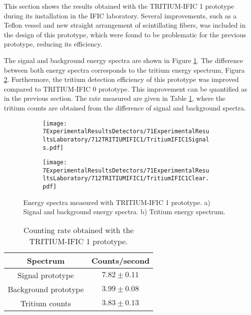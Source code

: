 This section shows the results obtained with the TRITIUM-IFIC 1 prototype  during its installation in the IFIC laboratory. Several improvements, such as a Teflon vessel and new straight arrangement of scintillating fibers, was included in the design of this prototype, which were found to be problematic for the previous prototype, reducing its efficiency.

The signal and background energy spectra are shown in Figure \ref{subfig:SignalBackgroundEnergySpectraTritiumIFIC1}. The difference between both energy spectra corresponds to the tritium energy spectrum, Figura \ref{subfig:TritiumEnergySpectraTritiumIFIC1}. Furthermore, the tritium detection efficiency of this prototype was improved compared to TRITIUM-IFIC 0 prototype. This improvement can be quantified as in the previous section. The rate measured are given in Table \ref{tab:CountsPerSecondTRITIUMIFIC1}, where the tritium counts are obtained from the difference of signal and background spectra.

\begin{figure}
\centering
    \begin{subfigure}[b]{1\textwidth}
    \centering
    \texttt{[image: 7ExperimentalResultsDetectors/71ExperimentalResultsLaboratory/712TRITIUMIFIC1/TritiumIFIC1Signals.pdf]}  
    \caption{\label{subfig:SignalBackgroundEnergySpectraTritiumIFIC1}}
    \end{subfigure}
    \hfill
    \begin{subfigure}[b]{1\textwidth}
    \centering
    \texttt{[image: 7ExperimentalResultsDetectors/71ExperimentalResultsLaboratory/712TRITIUMIFIC1/TritiumIFIC1Clear.pdf]}  
    \caption{\label{subfig:TritiumEnergySpectraTritiumIFIC1}}
    \end{subfigure}
 \caption{Energy spectra measured with TRITIUM-IFIC 1 prototype. a) Signal and background energy spectra. b) Tritium energy spectrum.}
 \label{fig:EnergySpectraTRITIUMIFIC1}
\end{figure}

\begin{table}[htbp]
\centering{}%
\begin{tabular}{cc}
\toprule 
Spectrum & Counts/second \tabularnewline
\midrule
\midrule 
Signal prototype & $7.82 \pm 0.11$ \tabularnewline
Background prototype & $3.99 \pm 0.08$ \tabularnewline  
Tritium counts & $3.83 \pm 0.13$ \tabularnewline
\bottomrule
\end{tabular}
\caption{Counting rate obtained with the TRITIUM-IFIC 1 prototype.}
\label{tab:CountsPerSecondTRITIUMIFIC1}
\end{table}

